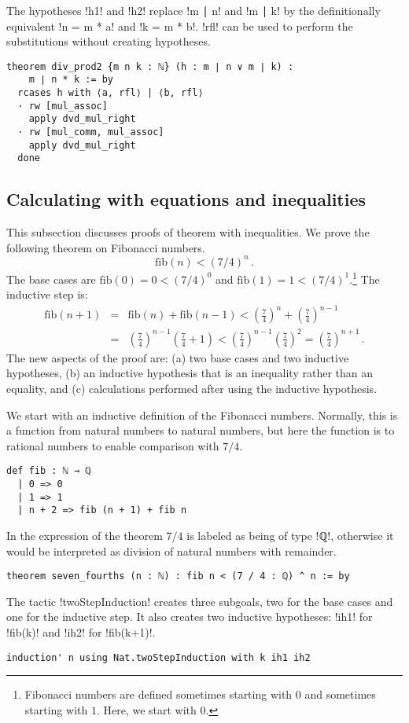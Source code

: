 The hypotheses !h1! and !h2! replace !m ∣ n! and !m ∣ k! by the definitionally equivalent !n = m * a! and !k = m * b!. !rfl! can be used to perform the substitutions without creating hypotheses.
\begin{Verbatim}
theorem div_prod2 {m n k : ℕ} (h : m ∣ n ∨ m ∣ k) :
    m ∣ n * k := by
  rcases h with ⟨a, rfl⟩ | ⟨b, rfl⟩
  · rw [mul_assoc]
    apply dvd_mul_right
  · rw [mul_comm, mul_assoc]
    apply dvd_mul_right
  done
\end{Verbatim}

\subsection{Calculating with equations and inequalities}

This subsection discusses proofs of theorem with inequalities. We prove the following theorem on Fibonacci numbers.
\[
\textrm{fib}(n) < (7/4)^n\,.
\]
The base cases are $\textrm{fib}(0) = 0 < (7/4)^0$ and $\textrm{fib}(1) = 1 < (7/4)^1$.\footnote{Fibonacci numbers are defined sometimes starting with $0$ and sometimes starting with $1$. Here, we start with $0$.} The inductive step is:
\begin{eqnarray*}
\textrm{fib}(n+1)&=&\textrm{fib}(n)+\textrm{fib}(n-1)<\left(\frac{7}{4}\right)^n + \left(\frac{7}{4}\right)^{n-1}\\
&=&\left(\frac{7}{4}\right)^{n-1}\left(\frac{7}{4}+1\right)<\left(\frac{7}{4}\right)^{n-1}\left(\frac{7}{4}\right)^2=\left(\frac{7}{4}\right)^{n+1}\,.
\end{eqnarray*}
The new aspects of the proof are: (a) two base cases and two inductive hypotheses, (b) an inductive hypothesis that is an inequality rather than an equality, and (c) calculations performed after using the inductive hypothesis.

We start with an inductive definition of the Fibonacci numbers. Normally, this is a function from natural numbers to natural numbers, but here the function is to rational numbers to enable comparison with $7/4$.
\begin{Verbatim}
def fib : ℕ → ℚ
  | 0 => 0
  | 1 => 1
  | n + 2 => fib (n + 1) + fib n
\end{Verbatim}
In the expression of the theorem $7/4$ is labeled as being of type !ℚ!, otherwise it would be interpreted as division of natural numbers with remainder.
\begin{Verbatim}[firstnumber=last]
theorem seven_fourths (n : ℕ) : fib n < (7 / 4 : ℚ) ^ n := by
\end{Verbatim}
The tactic !twoStepInduction! creates three subgoals, two for the base cases and one for the inductive step. It also creates two inductive hypotheses: !ih1! for !fib(k)! and !ih2! for !fib(k+1)!.
\begin{Verbatim}[firstnumber=last]
  induction' n using Nat.twoStepInduction with k ih1 ih2
\end{Verbatim}

